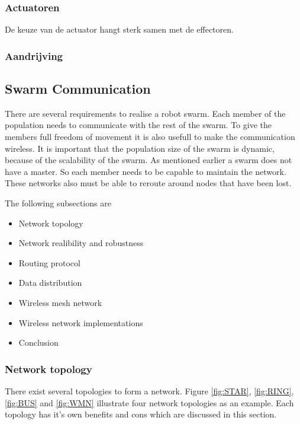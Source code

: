 \documentclass[10pt,a4paper]{article}
\begin{document}
\subsubsection{Actuatoren}

De keuze van de actuator hangt sterk samen met de effectoren.

\subsubsection{Aandrijving}

\newpage
\subsection{Swarm Communication}
There are several requirements to realise a robot swarm. Each member of the population needs to communicate with the rest of the swarm. To give the members full freedom of movement it is also usefull to make the communication wireless. It is important that the population size of the swarm is dynamic, because of the scalability of the swarm. As mentioned earlier a swarm does not have a master. So each member needs to be capable to maintain the network. These networks also must be able to reroute around nodes that have been lost. \cite{Swarmwiki}\cite{swarmintelligence}

The following subsections are 
\begin{itemize}
\setlength\itemsep{0em}
    \item Network topology
    \item Network realibility and robustness
    \item Routing protocol
    \item Data distribution
    \item Wireless mesh network
    \item Wireless network implementations
    \item Conclusion
\end{itemize}



\subsubsection{Network topology}
There exist several topologies to form a network. Figure \ref{fig:STAR}, \ref{fig:RING}, \ref{fig:BUS} and \ref{fig:WMN} illustrate four network topologies as an example. Each topology has it's own benefits and cons which are discussed in this section.
\end{document}
